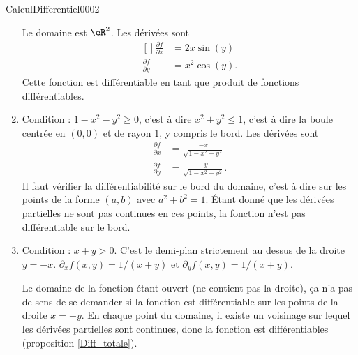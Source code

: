\begin{corrige}{CalculDifferentiel0002}
\begin{enumerate}
			Le domaine est $\eR^2$. Les dérivées sont
			\begin{equation}
				\begin{aligned}[]
					\frac{ \partial f }{ \partial x }&=2x\sin(y)\\
					\frac{ \partial f }{ \partial y }&=x^2\cos(y).
				\end{aligned}
			\end{equation}
			Cette fonction est différentiable en tant que produit de fonctions différentiables.
		\item
			Condition : $1-x^2-y^2\geq 0$, c'est à dire $x^2+y^2\leq 1$, c'est à dire la boule centrée en $(0,0)$ et de rayon $1$, y compris le bord. Les dérivées sont
			\begin{subequations}
				\begin{align}
					\frac{ \partial f }{ \partial x }&=\frac{ -x }{ \sqrt{1-x^2-y^2} }\\
					\frac{ \partial f }{ \partial y }&=\frac{ -y }{ \sqrt{1-x^2-y^2} }.
				\end{align}
			\end{subequations}
			Il faut vérifier la différentiabilité sur le bord du domaine, c'est à dire sur les points de la forme $(a,b)$ avec $a^2+b^2=1$. Étant donné que les dérivées partielles ne sont pas continues en ces points, la fonction n'est pas différentiable sur le bord.
		\item
			Condition : $x+y>0$. C'est le demi-plan strictement au dessus de la droite $y=-x$. $\partial_xf(x,y)=1/(x+y)$ et $\partial_yf(x,y)=1/(x+y)$.

			Le domaine de la fonction étant ouvert (ne contient pas la droite), ça n'a pas de sens de se demander si la fonction est différentiable sur les points de la droite $x=-y$. En chaque point du domaine, il existe un voisinage sur lequel les dérivées partielles sont continues, donc la fonction est différentiables (proposition \ref{Diff_totale}).
	\end{enumerate}

\end{corrige}
